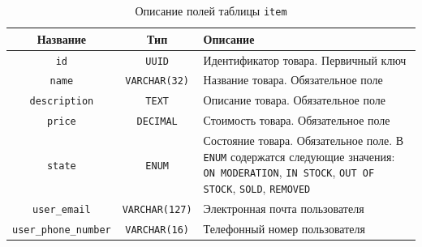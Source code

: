 \documentclass[a4paper,14pt]{extarticle}
\begin{document}
\begin{center}
    \begin{longtable}{|c|c|>{\centering\arraybackslash}m{7.5cm}|}
        \caption{Описание полей таблицы \texttt{item}}
        \label{tab:item}
        \\
        \hline
        \textbf{Название}            & \textbf{Тип}          & \textbf{Описание}                                                                                                                                                                     \\
        \hline
        \texttt{id}                  & \texttt{UUID}         & Идентификатор товара. Первичный ключ                                                                                                                                                  \\
        \hline
        \texttt{name}                & \texttt{VARCHAR(32)}  & Название товара. Обязательное поле                                                                                                                                                    \\
        \hline
        \texttt{description}         & \texttt{TEXT}         & Описание товара. Обязательное поле                                                                                                                                                    \\
        \hline
        \texttt{price}               & \texttt{DECIMAL}      & Стоимость товара. Обязательное поле                                                                                                                                                   \\
        \hline
        \texttt{state}               & \texttt{ENUM}         & Состояние товара. Обязательное поле. В \texttt{ENUM} содержатся следующие значения: \texttt{ON MODERATION}, \texttt{IN STOCK}, \texttt{OUT OF STOCK}, \texttt{SOLD}, \texttt{REMOVED} \\
        \hline
        \texttt{user\_email}         & \texttt{VARCHAR(127)} & Электронная почта пользователя                                                                                                                                                        \\
        \hline
        \texttt{user\_phone\_number} & \texttt{VARCHAR(16)}  & Телефонный номер пользователя                                                                                                                                                         \\

\end{longtable}
\end{center}
\end{document}
